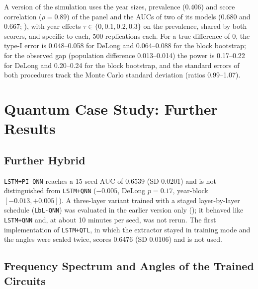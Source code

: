 \documentclass[11pt,a4paper]{article}
\begin{document}
A version of the simulation uses the year sizes, prevalence (0.406) and score correlation ($\rho=0.89$) of the panel and the AUCs of two of its models (0.680 and 0.667; ), with year effects $\tau\in\{0,0.1,0.2,0.3\}$ on the prevalence, shared by both scorers, and specific to each, 500 replications each. For a true difference of 0, the type-I error is 0.048--0.058 for DeLong and 0.064--0.088 for the block bootstrap; for the observed gap (population difference 0.013--0.014) the power is 0.17--0.22 for DeLong and 0.20--0.24 for the block bootstrap, and the standard errors of both procedures track the Monte Carlo standard deviation (ratios 0.99--1.07).

\section{Quantum Case Study: Further Results}
\label{app:qml}

\subsection{Further Hybrid}
\label{app:hybrids}

\texttt{LSTM+PI-QNN} reaches a 15-seed AUC of 0.6539 (SD 0.0201) and is not distinguished from \texttt{LSTM+QNN} ($-0.005$, DeLong $p=0.17$, year-block $[-0.013,+0.005]$). A three-layer variant trained with a staged layer-by-layer schedule (\texttt{LbL-QNN}) was evaluated in the earlier version only (); it behaved like \texttt{LSTM+QNN} and, at about 10 minutes per seed, was not rerun. The first implementation of \texttt{LSTM+QTL}, in which the extractor stayed in training mode and the angles were scaled twice, scores 0.6476 (SD 0.0106) and is not used.

\subsection{Frequency Spectrum and Angles of the Trained Circuits}
\label{app:spectrum}
\end{document}
